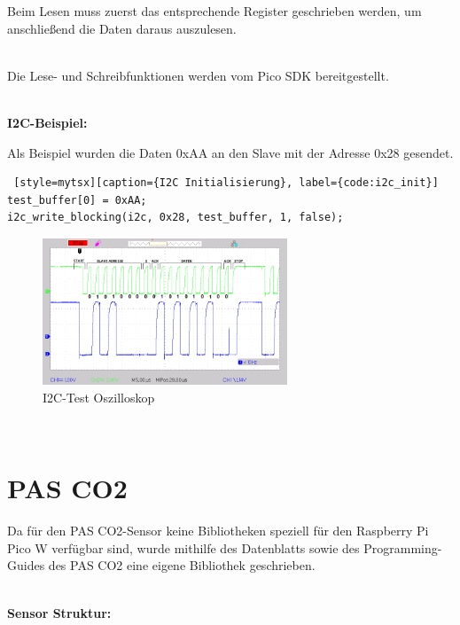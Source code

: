 \begin{inhalt}
Beim Lesen muss zuerst das entsprechende Register geschrieben werden, um anschließend die Daten daraus auszulesen. 

\bigskip \\
Die Lese- und Schreibfunktionen werden vom Pico SDK bereitgestellt.

\bigskip \\

\textbf{I2C-Beispiel:}

Als Beispiel wurden die Daten 0xAA an den Slave mit der Adresse 0x28 gesendet. 

\begin{lstlisting} [style=mytsx][caption={I2C Initialisierung}, label={code:i2c_init}]
test_buffer[0] = 0xAA;
i2c_write_blocking(i2c, 0x28, test_buffer, 1, false);
\end{lstlisting}


\begin{figure}[!htb]
\centering
\includegraphics[width=0.65\textwidth]{files/Tobias/pics/Messungen/I2C-Test.png}
\caption[I2C-Test Oszilloskop]{I2C-Test Oszilloskop}
\label{fig:I2C Test - Oszilloskop}
\end{figure}

\bigskip \\

\newpage

\section{PAS CO2}

Da für den PAS CO2-Sensor keine Bibliotheken speziell für den Raspberry Pi Pico W verfügbar sind, wurde mithilfe des Datenblatts \cite{Raspberry_Pi_Pico_W} sowie des Programming-Guides \cite{PASCO2_ProgrammingGuide} des PAS CO2 eine eigene Bibliothek geschrieben.

\bigskip \\

\textbf{Sensor Struktur:}


\end{inhalt}
